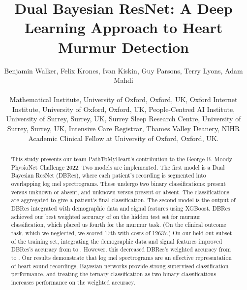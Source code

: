 \documentclass[twocolumn]{cinc}
\begin{document}

\newcommand{\cmmnt}[1]{\ignorespaces}
\graphicspath{{images/}{../images/}}



\title{Dual Bayesian ResNet: A Deep Learning Approach to Heart Murmur Detection}



\author {Benjamin Walker, Felix Krones, Ivan Kiskin, Guy Parsons, Terry Lyons,  Adam Mahdi \\
\ \\  Mathematical Institute, University of Oxford, Oxford, UK,
 Oxford Internet Institute, University of Oxford, Oxford, UK, 
  People-Centred AI Institute, University of Surrey, Surrey, UK,  Surrey Sleep Research Centre, University of Surrey, Surrey, UK,   Intensive Care Registrar, Thames Valley Deanery, NIHR Academic Clinical Fellow at University of Oxford, Oxford, UK.}


\maketitle

\begin{abstract}
    This study presents our team PathToMyHeart's contribution to the George B. Moody PhysioNet Challenge 2022.
Two models are implemented. The first model is a Dual Bayesian ResNet (DBRes), where each patient's recording is segmented into overlapping log mel spectrograms. These undergo two binary classifications: present versus unknown or absent, and unknown versus present or absent. The classifications are aggregated to give a patient's final classification. The second model is the output of DBRes integrated with demographic data and signal features using XGBoost.
DBRes achieved our best weighted accuracy of  on the hidden test set for murmur classification, which placed us fourth for the murmur task. (On the clinical outcome task, which we neglected, we scored 17th with costs of 12637.) On our held-out subset of the training set, integrating the demographic data and signal features improved DBRes's accuracy from  to . However, this decreased DBRes's weighted accuracy from  to . 
Our results demonstrate that log mel spectrograms are an effective representation of heart sound recordings, Bayesian networks provide strong supervised classification performance, and treating the ternary classification as two binary classifications increases performance on the weighted accuracy.



\end{abstract}
\end{document}
